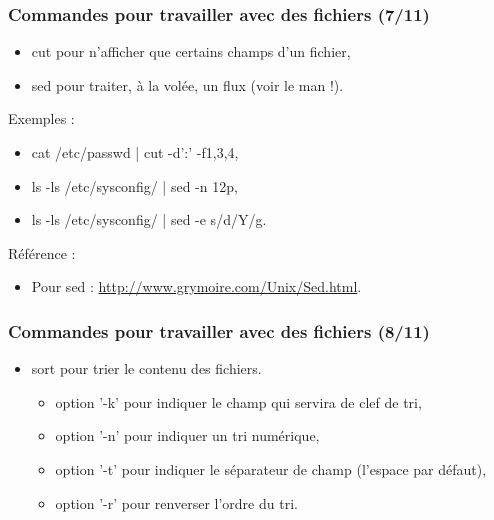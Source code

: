 \documentclass[handout,10pt]{beamer}
\begin{document}
\frame
{
    \frametitle{Commandes pour travailler avec des fichiers (7/11)}

    \begin{itemize}
        \item {\ttfamily cut} pour n'afficher que certains champs d'un fichier,
        \item {\ttfamily sed} pour traiter, à la volée, un flux (voir le man !).
    \end{itemize}

    Exemples :

    \begin{itemize}
        \item {\ttfamily cat /etc/passwd | cut -d'\string:' -f1,3,4},
        \item {\ttfamily ls -ls /etc/sysconfig/ | sed -n 1\tild 2p},
        \item {\ttfamily ls -ls /etc/sysconfig/ | sed -e s/d/Y/g}.
    \end{itemize}

    Référence :

    \begin{itemize}
        \item Pour sed : \href{http://www.grymoire.com/Unix/Sed.html}{http://www.grymoire.com/Unix/Sed.html}.
    \end{itemize}
}


\frame
{
    \frametitle{Commandes pour travailler avec des fichiers (8/11)}

    \begin{itemize}
        \item {\ttfamily sort} pour trier le contenu des fichiers.
            \begin{itemize}
                \item option '-k' pour indiquer le champ qui servira de clef de tri,
                \item option '-n' pour indiquer un tri numérique,
                \item option '-t' pour indiquer le séparateur de champ (l'espace par défaut),
                \item option '-r' pour renverser l'ordre du tri.
            \end{itemize}
    \end{itemize}
}
\end{document}
